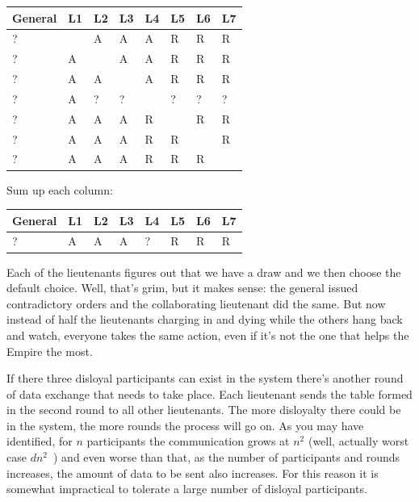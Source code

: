 \documentclass[a4paper]{report}
\begin{document}
\begin{center}
	\begin{tabular}{|l|l|l|l|l|l|l|l|}
		\hline
		General & L1 & L2 & L3 & L4 & L5 & L6 & L7 \\
		\hline
		?       & ~  & A  & A  & A  & R  & R  & R  \\ \hline
		?       & A  & ~  & A  & A  & R  & R  & R  \\ \hline
		?       & A  & A  & ~  & A  & R  & R  & R  \\ \hline
		?       & A  & ?  & ?  & ~  & ?  & ?  & ?  \\ \hline
		?       & A  & A  & A  & R  & ~  & R  & R  \\ \hline
		?       & A  & A  & A  & R  & R  & ~  & R  \\ \hline
		?       & A  & A  & A  & R  & R  & R  & ~  \\ \hline
	\end{tabular}
\end{center}

Sum up each column:

\begin{center}
	\begin{tabular}{|l|l|l|l|l|l|l|l|}
		\hline
		General & L1 & L2 & L3 & L4 & L5 & L6 & L7 \\
		\hline
		?       & A  & A  & A  & ?  & R  & R  & R  \\
		\hline
	\end{tabular}
\end{center}

Each of the lieutenants figures out that we have a draw and we then choose the default choice. Well, that's grim, but it makes sense: the general issued contradictory orders and the collaborating lieutenant did the same. But now instead of half the lieutenants charging in and dying while the others hang back and watch, everyone takes the same action, even if it's not the one that helps the Empire the most.

If there three disloyal participants can exist in the system there's another round of data exchange that needs to take place. Each lieutenant sends the table formed in the second round to all other lieutenants. The more disloyalty there could be in the system, the more rounds the process will go on. As you may have identified, for $n$ participants the communication grows at $n^{2}$ (well, actually worst case $dn^{2}$~\cite{mte241}) and even worse than that, as the number of participants and rounds increases, the amount of data to be sent also increases. For this reason it is somewhat impractical to tolerate a large number of disloyal participants.
\end{document}
